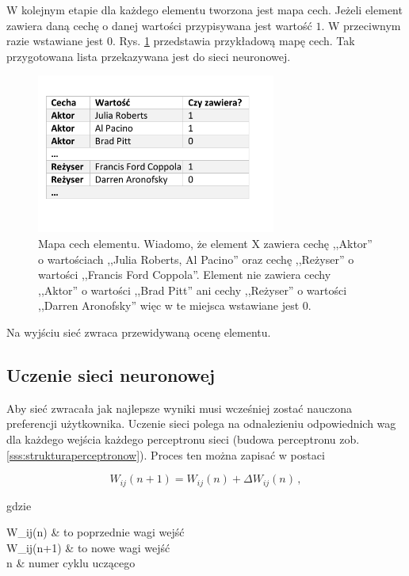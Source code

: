 \documentclass[twoside]{iisthesis}
\begin{document}
		 W kolejnym etapie dla każdego elementu tworzona jest mapa cech. Jeżeli element zawiera daną cechę o danej wartości przypisywana jest wartość $1$. W przeciwnym razie wstawiane jest $0$. Rys. \ref{fig:mapacech} przedstawia przykładową mapę cech. Tak przygotowana lista przekazywana jest do sieci neuronowej. 
		 
		 \begin{figure}%
		 	\centering
		 	\includegraphics[width=0.7\textwidth]{mapacech}
		 	\caption{Mapa cech elementu. Wiadomo, że element X zawiera cechę ,,Aktor'' o wartościach ,,Julia Roberts, Al Pacino'' oraz cechę ,,Reżyser'' o wartości ,,Francis Ford Coppola''. Element nie zawiera cechy ,,Aktor'' o wartości ,,Brad Pitt'' ani cechy ,,Reżyser'' o wartości ,,Darren Aronofsky'' więc w te miejsca wstawiane jest $0$.}
		 	\label{fig:mapacech}
		 \end{figure}
		 
		 Na wyjściu sieć zwraca przewidywaną ocenę elementu.
		 		 
		 
		 \subsection{Uczenie sieci neuronowej}
		 \label{ss:uczeniesiecineuronowej}
		 
		 Aby sieć zwracała jak najlepsze wyniki musi wcześniej zostać nauczona preferencji użytkownika. Uczenie sieci polega na odnalezieniu odpowiednich wag dla każdego wejścia każdego perceptronu sieci (budowa perceptronu zob. \ref{sss:strukturaperceptronow}). Proces ten można zapisać w postaci
		 
		 \begin{equation}
		 \label{eq:weightadaptation}
		 W_{ij}(n+1) = W_{ij}(n) + \Delta W_{ij}(n) 
		 \,,
		 \end{equation}
		 		 
		 gdzie
		 
		 \begin{conditions*}
		 	W_{ij}(n) & to poprzednie wagi wejść \\
		 	W_{ij}(n+1) & to nowe wagi wejść \\
		 	n & numer cyklu uczącego 
		 \end{conditions*} 
		 
\end{document}
